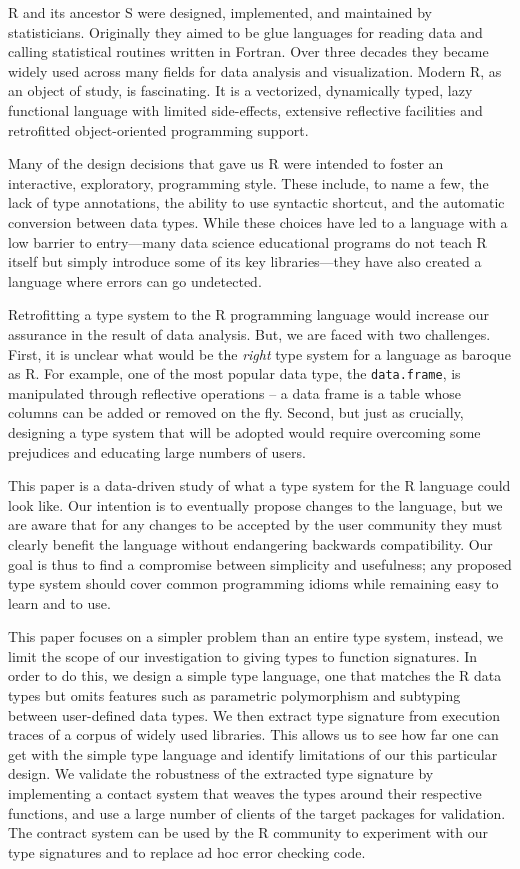 \documentclass[acmsmall,review,anonymous]{acmart}\settopmatter{printfolios=true,printccs=false,printacmref=false}
\newcommand{\code}[1]{{\lstinline[style=Rin]!#1!}\xspace}
\begin{document}
R and its ancestor S were designed, implemented, and maintained by
statisticians. Originally they aimed to be glue languages for reading data
and calling statistical routines written in Fortran. Over three decades they
became widely used across many fields for data analysis and visualization.
Modern R, as an object of study, is fascinating. It is a vectorized,
dynamically typed, lazy functional language with limited side-effects,
extensive reflective facilities and retrofitted object-oriented programming
support.

Many of the design decisions that gave us R were intended to foster an
interactive, exploratory, programming style. These include, to name a few,
the lack of type annotations, the ability to use syntactic shortcut, and the
automatic conversion between data types.  While these choices have led to a
language with a low barrier to entry---many data science educational
programs do not teach R itself but simply introduce some of its key
libraries---they have also created a language where errors can go
undetected.

Retrofitting a type system to the R programming language would increase our
assurance in the result of data analysis. But, we are faced with two
challenges. First, it is unclear what would be the \emph{right} type system
for a language as baroque as R. For example, one of the most popular data
type, the \code{data.frame}, is manipulated through reflective operations --
a data frame is a table whose columns can be added or removed on the fly.
Second, but just as crucially, designing a type system that will be adopted
would require overcoming some prejudices and educating large numbers of
users.

This paper is a data-driven study of what a type system for the R language
could look like. Our intention is to eventually propose changes to the
language, but we are aware that for any changes to be accepted by the user
community they must clearly benefit the language without endangering
backwards compatibility. Our goal is thus to find a compromise between
simplicity and usefulness; any proposed type system should cover common
programming idioms while remaining easy to learn and to use.

This paper focuses on a simpler problem than an entire type system, instead,
we limit the scope of our investigation to giving types to function
signatures. In order to do this, we design a simple type language, one that
matches the R data types but omits features such as parametric polymorphism
and subtyping between user-defined data types. We then extract type
signature from execution traces of a corpus of widely used libraries.  This
allows us to see how far one can get with the simple type language and
identify limitations of our this particular design. We validate the
robustness of the extracted type signature by implementing a contact system
that weaves the types around their respective functions, and use a large
number of clients of the target packages for validation. The contract system
can be used by the R community to experiment with our type signatures and to
replace ad hoc error checking code.
\end{document}
